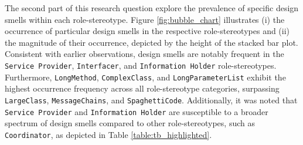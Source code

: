 \documentclass[AMA,Times1COL]{WileyNJDv5} %
\begin{document}
	The second part of this research question explore the prevalence of specific design smells within each role-stereotype. Figure \ref{fig:bubble_chart} illustrates (i) the occurrence of particular design smells in the respective role-stereotypes and (ii) the magnitude of their occurrence, depicted by the height of the stacked bar plot. Consistent with earlier observations, design smells are notably frequent in the {\tt Service Provider}, {\tt Interfacer}, and {\tt Information Holder} role-stereotypes. Furthermore, {\tt LongMethod}, {\tt ComplexClass}, and {\tt LongParameterList} exhibit the highest occurrence frequency across all role-stereotype categories, surpassing {\tt LargeClass}, {\tt MessageChains}, and {\tt SpaghettiCode}. Additionally, it was noted that {\tt Service Provider} and {\tt Information Holder} are susceptible to a broader spectrum of design smells compared to other role-stereotypes, such as {\tt Coordinator}, as depicted in Table \ref{table:tb_highlighted}.
\end{document}

